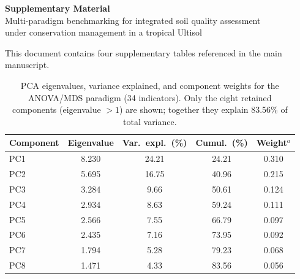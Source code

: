 \documentclass[12pt]{article}
\begin{document}
\begin{center}
{\Large\bfseries Supplementary Material}\\[6pt]
{\large Multi-paradigm benchmarking for integrated soil quality assessment\\
under conservation management in a tropical Ultisol}\\[12pt]
\end{center}

\noindent This document contains four supplementary tables referenced in the main manuscript.

\clearpage
\begin{table}[ht]
\centering
\caption{PCA eigenvalues, variance explained, and component weights for the ANOVA/MDS paradigm (34 indicators). Only the eight retained components (eigenvalue $> 1$) are shown; together they explain 83.56\% of total variance.}\label{tab:s1_eigen}
\begin{tabular}{lcccc}
\toprule
Component & Eigenvalue & Var.\ expl.\ (\%) & Cumul.\ (\%) & Weight$^a$ \\
\midrule
PC1  & 8.230 & 24.21 & 24.21 & 0.310 \\
PC2  & 5.695 & 16.75 & 40.96 & 0.215 \\
PC3  & 3.284 & 9.66  & 50.61 & 0.124 \\
PC4  & 2.934 & 8.63  & 59.24 & 0.111 \\
PC5  & 2.566 & 7.55  & 66.79 & 0.097 \\
PC6  & 2.435 & 7.16  & 73.95 & 0.092 \\
PC7  & 1.794 & 5.28  & 79.23 & 0.068 \\
PC8  & 1.471 & 4.33  & 83.56 & 0.056 \\
\bottomrule
\end{tabular}
\smallskip

\end{table}
\end{document}
